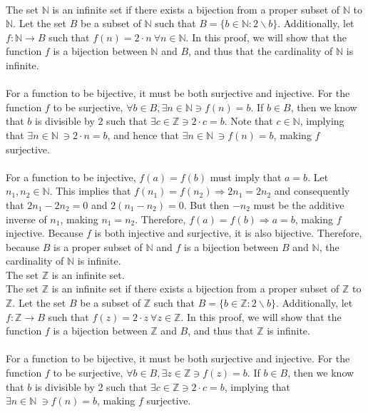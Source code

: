 \documentclass{article}
\begin{document}
\\[0.05in]  The set $\mathbb{N}$ is an infinite set if there exists a bijection from a proper subset of $\mathbb{N}$ to $\mathbb{N}$. Let the set $B$ be a subset of $\mathbb{N}$ such that $B = \{b \in \mathbb{N}: 2\backslash b \}$. Additionally, let $f: \mathbb{N} \rightarrow B$ such that $f(n) = 2\cdot n \ \forall n \in \mathbb{N}$. In this proof, we will show that the function $f$ is a bijection between $\mathbb{N}$ and $B$, and thus that the cardinality of $\mathbb{N}$ is infinite.
\\ \\
For a function to be bijective, it must be both surjective and injective. For the function $f$ to be surjective, $\forall b \in B, \exists n \in \mathbb{N} \ni f(n) = b$. If $b \in B$, then we know that $b$ is divisible by 2 such that $\exists c \in \mathbb{Z} \ni 2\cdot c = b$. Note that $c \in \mathbb{N}$, implying that $\exists n \in \mathbb{N} \ \ni 2\cdot n = b$, and hence that $\exists n \in \mathbb{N} \ \ni f(n) = b$, making $f$ surjective.
\\ \\
For a function to be injective, $f(a) = f(b)$ must imply that $a = b$.  Let $n_1, n_2 \in \mathbb{N}$. This implies that $f(n_1) = f(n_2) \Rightarrow 2n_1 = 2n_2$ and consequently that $2n_1 - 2n_2 = 0$ and $2(n_1 - n_2) = 0$. But then $-n_2$ must be the additive inverse of $n_1$, making $n_1 = n_2$. Therefore, $f(a) = f(b) \Rightarrow a = b$, making $f$ injective. Because $f$ is both injective and surjective, it is also bijective.  Therefore, because $B$ is a proper subset of $\mathbb{N}$ and $f$ is a bijection between $B$ and $\mathbb{N}$, the cardinality of $\mathbb{N}$ is infinite.
\\[0.1in]  The set $\mathbb{Z}$ is an infinite set.
\\[0.05in] The set $\mathbb{Z}$ is an infinite set if there exists a bijection from a proper subset of $\mathbb{Z}$ to $\mathbb{Z}$. Let the set $B$ be a subset of $\mathbb{Z}$ such that $B = \{b \in \mathbb{Z}: 2\backslash b \}$. Additionally, let $f: \mathbb{Z} \rightarrow B$ such that $f(z) = 2\cdot z \ \forall z \in \mathbb{Z}$. In this proof, we will show that the function $f$ is a bijection between $\mathbb{Z}$ and $B$, and thus that $\mathbb{Z}$ is  infinite.
\\ \\
For a function to be bijective, it must be both surjective and injective. For the function $f$ to be surjective, $\forall b \in B, \exists z \in \mathbb{Z} \ni f(z) = b$. If $b \in B$, then we know that $b$ is divisible by 2 such that $\exists c \in \mathbb{Z} \ni 2\cdot c = b$, implying that $\exists n \in \mathbb{N} \ \ni f(n) = b$, making $f$ surjective.
\end{document}
